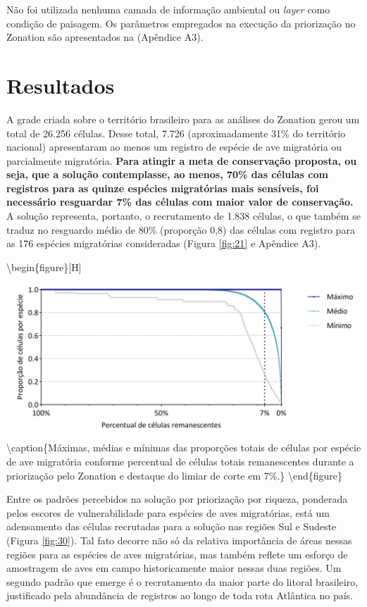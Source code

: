 \documentclass[
  oneside]{scrbook}
\begin{document}
Não foi utilizada nenhuma camada de informação ambiental ou \emph{layer} como condição de paisagem. Os parâmetros empregados na execução da priorização no Zonation são apresentados na (Apêndice A3).

\hypertarget{resultados}{%
\section{Resultados}\label{resultados}}

A grade criada sobre o território brasileiro para as análises do Zonation gerou um total de 26.256 células. Desse total, 7.726 (aproximadamente 31\% do território nacional) apresentaram ao menos um registro de espécie de ave migratória ou parcialmente migratória. \textbf{Para atingir a meta de conservação proposta, ou seja, que a solução contemplasse, ao menos, 70\% das células com registros para as quinze espécies migratórias mais sensíveis, foi necessário resguardar 7\% das células com maior valor de conservação.} A solução representa, portanto, o recrutamento de 1.838 células, o que também se traduz no resguardo médio de 80\% (proporção 0,8) das células com registro para as 176 espécies migratórias consideradas (Figura \ref{fig:21} e Apêndice A3).

\textbackslash begin\{figure\}{[}H{]}
\includegraphics[width=0.85\linewidth]{imagens/cap07/Figura_7.1} \textbackslash caption\{Máximas, médias e mínimas das proporções totais de células por espécie de ave migratória conforme percentual de células totais remanescentes durante a priorização pelo Zonation e destaque do limiar de corte em 7\%.\}\label{fig:21}
\textbackslash end\{figure\}

Entre os padrões percebidos na solução por priorização por riqueza, ponderada pelos escores de vulnerabilidade para espécies de aves migratórias, está um adensamento das células recrutadas para a solução nas regiões Sul e Sudeste (Figura \ref{fig:30}). Tal fato decorre não só da relativa importância de áreas nessas regiões para as espécies de aves migratórias, mas também reflete um esforço de amostragem de aves em campo historicamente maior nessas duas regiões. Um segundo padrão que emerge é o recrutamento da maior parte do litoral brasileiro, justificado pela abundância de registros ao longo de toda rota Atlântica no país.
\end{document}
